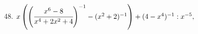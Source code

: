 48. $x\left(\left(\cfrac{x^6-8}{x^4+2x^2+4}\right)^{-1}-(x^2+2)^{-1}\right)+(4-x^4)^{-1}:x^{-5},$\\
